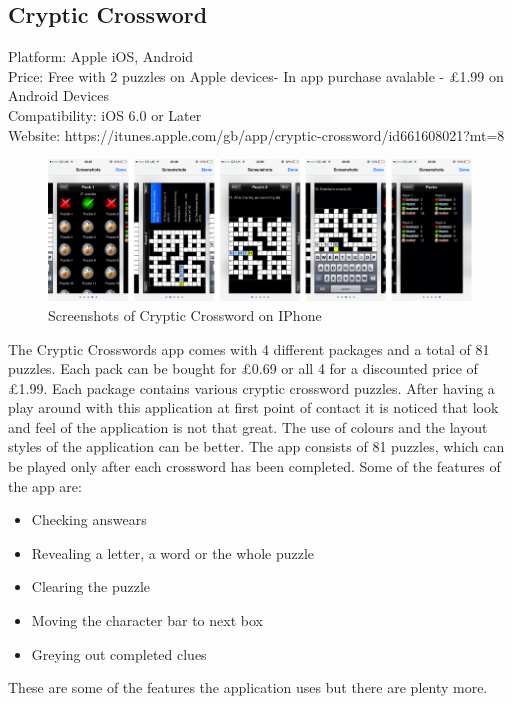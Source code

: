 \subsection{Cryptic Crossword}

Platform: Apple iOS, Android\\
Price: Free with 2 puzzles on Apple devices- In app purchase avalable - \pounds1.99 on Android Devices\\
Compatibility: iOS 6.0 or Later\\
Website: https://itunes.apple.com/gb/app/cryptic-crossword/id661608021?mt=8


\begin{figure}[!ht]
    \includegraphics[width=\linewidth]{research/mobile_platforms/cc.png}
    \caption{Screenshots of Cryptic Crossword on IPhone}
\end{figure}

The Cryptic Crosswords app comes with 4 different packages and a total of 81 puzzles. Each pack can be bought for \pounds0.69 or all 4 for a discounted price of \pounds1.99. Each package contains various cryptic crossword puzzles. After having a play around with this application at first point of contact it is noticed that look and feel of the application is not that great. The use of colours and the layout styles of the application can be better. The app consists of 81 puzzles, which can be played only after each crossword has been completed. Some of the features of the app are:

\begin{itemize}
    \item Checking answears
    \item Revealing a letter, a word or the whole puzzle
    \item Clearing the puzzle
    \item Moving the character bar to next box
    \item Greying out completed clues
\end{itemize}

These are some of the features the application uses but there are plenty more. 

